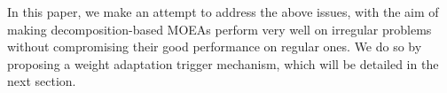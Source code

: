 


In this paper, we make an attempt to address the above issues, with the aim of making decomposition-based MOEAs perform very well on irregular problems without compromising their good performance on regular ones. We do so by proposing a weight adaptation trigger mechanism, which will be detailed in the next section. 


